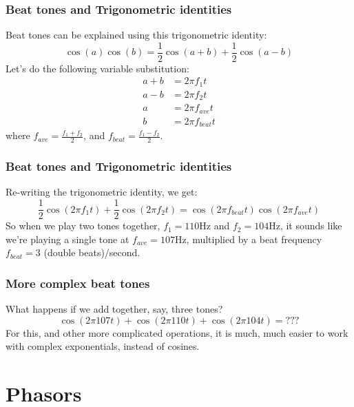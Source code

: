 \documentclass{beamer}
\begin{document}
\begin{frame}
  \frametitle{Beat tones and Trigonometric identities}

  Beat tones can be explained using this trigonometric identity:
  \[
  \cos(a)\cos(b)=\frac{1}{2}\cos(a+b)+\frac{1}{2}\cos(a-b)
  \]
  Let's do the following variable substitution:
  \begin{align*}
    a+b &= 2\pi f_1 t\\
    a-b &= 2\pi f_2 t\\
    a &= 2\pi f_{ave}t\\
    b &= 2\pi f_{beat}t
  \end{align*}
  where $f_{ave}=\frac{f_1+f_2}{2}$, and $f_{beat}=\frac{f_1-f_2}{2}$.
\end{frame}

\begin{frame}
  \frametitle{Beat tones and Trigonometric identities}

  Re-writing the trigonometric identity, we get:
  \[
  \frac{1}{2}\cos(2\pi f_1t)+\frac{1}{2}\cos(2\pi f_2 t) = \cos(2\pi f_{beat}t)\cos(2\pi f_{ave}t)
  \]
  So when we play two tones together, $f_1=110$Hz and $f_2=104$Hz, it
  sounds like we're playing a single tone at $f_{ave}=107$Hz,
  multiplied by a beat frequency $f_{beat}=3$ (double beats)/second.
\end{frame}



\begin{frame}
  \frametitle{More complex beat tones}

  What happens if we add together, say, three tones?
  \[
  \cos(2\pi 107t) + \cos(2\pi 110t)+\cos(2\pi 104t)=\mbox{???}
  \]
  For this, and other more complicated operations, it
  is much, much easier to work with complex exponentials, instead of cosines.
\end{frame}
  

\section[Phasors]{Phasors}
\setcounter{subsection}{1}
\end{document}
